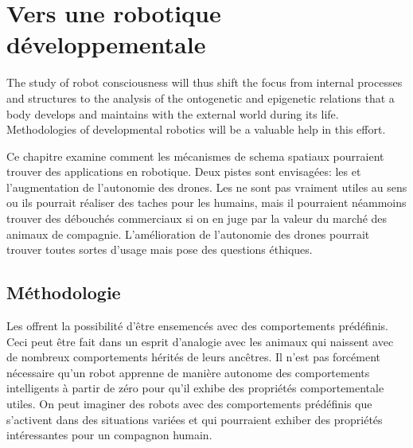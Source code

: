 \chapter{Vers une robotique développementale}

 \cite{schmidhuber_developmental_2006}

 \cite{cangelosi_developmental_2015}

The study of robot consciousness will thus shift the focus from internal processes and structures to the analysis of the ontogenetic and epigenetic relations that a body develops and maintains with the external world during its life. Methodologies of developmental robotics will be a valuable help in this effort. \cite{manzotti_good_2018}


Ce chapitre examine comment les mécanismes de schema spatiaux pourraient trouver des applications en robotique. 
Deux pistes sont envisagées: les  et l'augmentation de l'autonomie des drones. 
Les  ne sont pas vraiment utiles au sens ou ils pourrait réaliser des taches pour les humains, mais il pourraient néammoins trouver des débouchés commerciaux si on en juge par la valeur du marché des animaux de compagnie. 
L'amélioration de l'autonomie des drones pourrait trouver toutes sortes d'usage mais pose des questions éthiques. 


\section{Méthodologie}

Les  offrent la possibilité d'être \og ensemencés \fg avec des comportements prédéfinis. 
Ceci peut être fait dans un esprit d'analogie avec les animaux qui naissent avec de nombreux comportements hérités de leurs ancêtres. 
Il n'est pas forcément nécessaire qu'un robot apprenne de manière autonome des comportements intelligents à partir de zéro pour qu'il exhibe des propriétés comportementale utiles. 
On peut imaginer des robots avec des comportements prédéfinis que s'activent dans des situations variées et qui pourraient exhiber des propriétés intéressantes pour un compagnon humain. 



